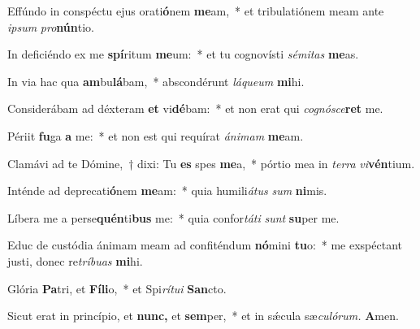 \item Effúndo in conspéctu ejus orati\textbf{ó}nem \textbf{me}am,~* et tribulatiónem meam ante \textit{ipsum} \textit{pro}\textbf{nún}tio.
\item In deficiéndo ex me \textbf{spí}ritum \textbf{me}um:~* et tu cognovísti \textit{sémitas} \textbf{me}as.
\item In via hac qua \textbf{am}bu\textbf{lá}bam,~* abscondérunt \textit{láqueum} \textbf{mi}hi.
\item Considerábam ad déxteram \textbf{et} vi\textbf{dé}bam:~* et non erat qui \textit{cognósce}\textbf{ret} me.
\item Périit \textbf{fu}ga \textbf{a} me:~* et non est qui requírat \textit{ánimam} \textbf{me}am.
\item Clamávi ad te  Dómine,~† dixi: Tu \textbf{es} spes \textbf{me}a,~* pórtio mea in \textit{terra} \textit{vi}\textbf{vén}tium.
\item Inténde ad deprecati\textbf{ó}nem \textbf{me}am:~* quia humili\tinyhspace\textit{átus} \textit{sum} \textbf{ni}mis.
\item Líbera me a perse\textbf{quén}ti\textbf{bus} me:~* quia confor\teenyhspace\textit{táti} \textit{sunt} \textbf{su}per me.
\item Educ de custódia ánimam meam ad confiténdum \textbf{nó}mini \textbf{tu}o:~* me exspéctant justi, donec re\tinyhspace\textit{tríbuas} \textbf{mi}hi.
\item Glória \textbf{Pa}tri, et \textbf{Fí}\textbf{li}o,~* et Spi\tinyhspace\textit{rítui} \textbf{San}cto.
\item Sicut erat in princípio, et \textbf{nunc,} et \textbf{sem}per,~* et in sǽcula sæ\tinyhspace\textit{culórum.} \textbf{A}men.
